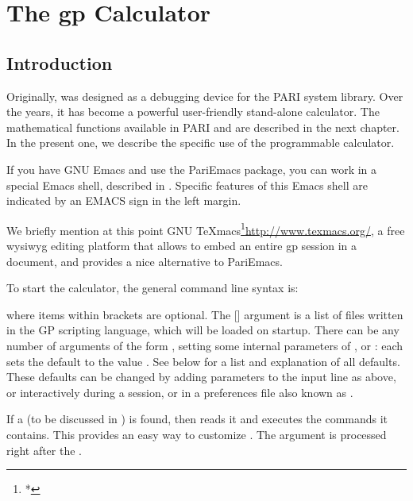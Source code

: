 %
%
\chapter{The gp Calculator}

\section{Introduction}

Originally,  was designed as a debugging device for the PARI system
library. Over the years, it has become a powerful user-friendly stand-alone
calculator. The mathematical functions available in PARI and  are
described in the next chapter. In the present one, we describe the specific
use of the  programmable calculator.

\emacs If you have GNU Emacs and use the PariEmacs package, you can work in a
special Emacs shell, described in . Specific features of
this Emacs shell are indicated by an EMACS sign in the left margin.

We briefly mention at this point GNU
TeXmacs\footnote{*}{\url{http://www.texmacs.org/}}, a free wysiwyg editing
platform that allows to embed an entire gp session in a document, and
provides a nice alternative to PariEmacs.


To start the calculator, the general command line syntax is:


\noindent
where items within brackets are optional. The [] argument is a
list of files written in the GP scripting language, which will be loaded on
startup. There can be any number of arguments of the form
, setting some internal parameters of ,
or : each sets the default  to the value . See
 below for a list and explanation of all defaults. These
defaults can be changed by adding parameters to the input line as above, or
interactively during a  session, or in a preferences file also known
as .

If a  (to be discussed in ) is
found,  then reads it and executes the commands it contains. This
provides an easy way to customize . The  argument is
processed right after the .

